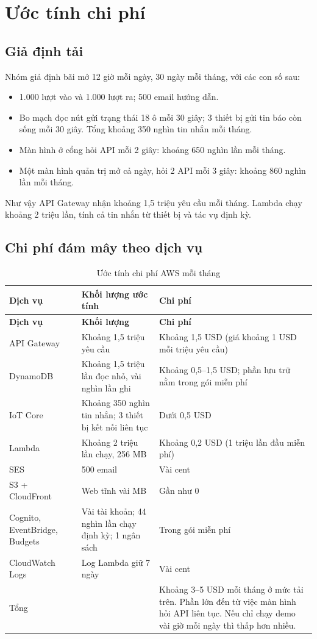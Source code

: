 \section{Ước tính chi phí}

\subsection{Giả định tải}

Nhóm giả định bãi mở 12 giờ mỗi ngày, 30 ngày mỗi tháng, với các con số sau:
\begin{itemize}
  \item 1.000 lượt vào và 1.000 lượt ra; 500 email hướng dẫn.
  \item Bo mạch đọc nút gửi trạng thái 18 ô mỗi 30 giây; 3 thiết bị gửi tin báo còn sống mỗi 30 giây. Tổng khoảng 350 nghìn tin nhắn mỗi tháng.
  \item Màn hình ở cổng hỏi API mỗi 2 giây: khoảng 650 nghìn lần mỗi tháng.
  \item Một màn hình quản trị mở cả ngày, hỏi 2 API mỗi 3 giây: khoảng 860 nghìn lần mỗi tháng.
\end{itemize}
Như vậy API Gateway nhận khoảng 1,5 triệu yêu cầu mỗi tháng. Lambda chạy khoảng 2 triệu lần, tính cả tin nhắn từ thiết bị và tác vụ định kỳ.

\subsection{Chi phí đám mây theo dịch vụ}

\begin{longtable}{@{}P{3.2cm}P{5.4cm}P{5.5cm}@{}}
\caption{Ước tính chi phí AWS mỗi tháng}\label{tab:chiphi}\\
\toprule
\textbf{Dịch vụ} & \textbf{Khối lượng ước tính} & \textbf{Chi phí} \\ \midrule
\endfirsthead
\toprule
\textbf{Dịch vụ} & \textbf{Khối lượng} & \textbf{Chi phí} \\ \midrule
\endhead
API Gateway & Khoảng 1,5 triệu yêu cầu & Khoảng 1,5 USD (giá khoảng 1 USD mỗi triệu yêu cầu) \\
DynamoDB & Khoảng 1,5 triệu lần đọc nhỏ, vài nghìn lần ghi & Khoảng 0,5--1,5 USD; phần lưu trữ nằm trong gói miễn phí \\
IoT Core & Khoảng 350 nghìn tin nhắn; 3 thiết bị kết nối liên tục & Dưới 0,5 USD \\
Lambda & Khoảng 2 triệu lần chạy, 256 MB & Khoảng 0,2 USD (1 triệu lần đầu miễn phí) \\
SES & 500 email & Vài cent \\
S3 + CloudFront & Web tĩnh vài MB & Gần như 0 \\
Cognito, EventBridge, Budgets & Vài tài khoản; 44 nghìn lần chạy định kỳ; 1 ngân sách & Trong gói miễn phí \\
CloudWatch Logs & Log Lambda giữ 7 ngày & Vài cent \\
\midrule
Tổng & & Khoảng 3--5 USD mỗi tháng ở mức tải trên. Phần lớn đến từ việc màn hình hỏi API liên tục. Nếu chỉ chạy demo vài giờ mỗi ngày thì thấp hơn nhiều. \\
\bottomrule
\end{longtable}

